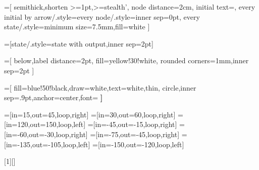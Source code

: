 \usepackage{tikz}
\usetikzlibrary{automata}
\usetikzlibrary{arrows}
\usetikzlibrary{quotes}
\usetikzlibrary{calc}

=[
  semithick,shorten >=1pt,>=stealth',
  node distance=2cm,
  initial text=,
  every initial by arrow/.style={every node/.style={inner sep=0pt}},
  every state/.style={minimum size=7.5mm,fill=white}
]

=[state/.style=state with output,inner sep=2pt]
\def\slabel#1{\nodepart{lower} #1}

=[
  below,label distance=2pt,
  fill=yellow!30!white,
  rounded corners=1mm,inner sep=2pt
]

=[
  fill=blue!50!black,draw=white,text=white,thin,
  circle,inner sep=.9pt,anchor=center,font=\bfseries\sffamily\tiny
]

=[in=15,out=45,loop,right]
=[in=30,out=60,loop,right]
=[in=120,out=150,loop,left]
=[in=-45,out=-15,loop,right]
=[in=-60,out=-30,loop,right]
=[in=-75,out=-45,loop,right]
=[in=-135,out=-105,loop,left]
=[in=-150,out=-120,loop,left]


\usepackage{environ}
[1][]%
{\scalebox{1.5}{\begin{tikzpicture}[automaton,#1]
\BODY
\end{tikzpicture}}}


\usepackage{amsmath}
\DeclareMathOperator{\F}{\textup{\textsf{F}}}
\DeclareMathOperator{\G}{\textup{\textsf{G}}}
\DeclareMathOperator{\X}{\textup{\textsf{X}}}
\newcommand{\U}{\mathbin{\textsf{U}}}
\newcommand{\R}{\mathbin{\textsf{R}}}
\newcommand{\W}{\mathbin{\textsf{W}}}
\newcommand{\M}{\mathbin{\textsf{M}}}
